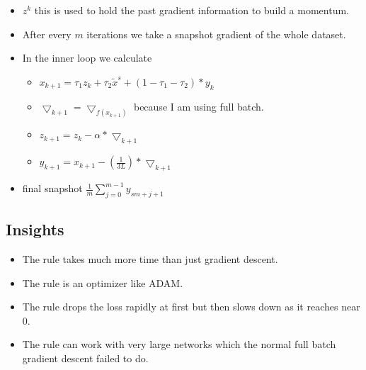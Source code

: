 \documentclass[../main.tex]{subfiles}
\begin{document}
\begin{itemize}
\begin{itemize}
      \item $z^{k}$ this is used to hold the past gradient information to build a momentum.
    \end{itemize}
    \begin{itemize}
  \item After every $m$ iterations we take a snapshot gradient of the whole dataset.
  \item In the inner loop we calculate
    \begin{itemize}
      \item $x_{k+1} = \tau_{1}z_{k} + \tau_{2}\tilde{x}^{s} + (1 - \tau_{1} - \tau_{2})*y_{k}$
      \item $\bigtriangledown_{k+1} = \bigtriangledown_{f(x_{k+1})}$ because I am using full batch.
        \item $z_{k+1} = z_{k} - \alpha * \bigtriangledown_{k+1}$
        \item $y_{k+1} = x_{k+1} - (\frac{1}{3L})*\bigtriangledown_{k+1}$
    \end{itemize}
  \item final snapshot $\frac{1}{m}\sum_{j=0}^{m-1}{y_{sm+j+1}}$
\end{itemize}
\end{itemize}
\subsection{Insights}
\begin{itemize}
  \item The rule takes much more time than just gradient descent.
    \item The rule is an optimizer like ADAM.
    \item The rule drops the loss rapidly at first but then slows down as it reaches near $0$.
    \item The rule can work with very large networks which the normal full batch gradient descent failed to do.
\end{itemize}
\end{document}
